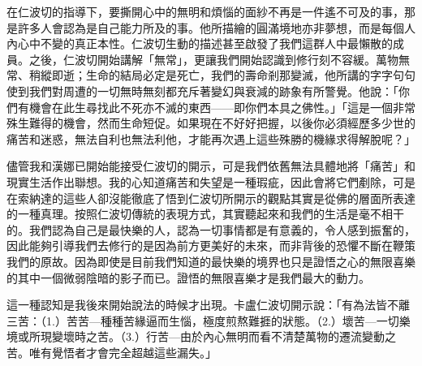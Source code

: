 在仁波切的指導下，要撕開心中的無明和煩惱的面紗不再是一件遙不可及的事，那是許多人會認為是自己能力所及的事。他所描繪的圓滿境地亦非夢想，而是每個人內心中不變的真正本性。仁波切生動的描述甚至啟發了我們這群人中最懶散的成員。之後，仁波切開始講解「無常」，更讓我們開始認識到修行刻不容緩。萬物無常、稍縱即逝；生命的結局必定是死亡，我們的壽命剎那變滅，他所講的字字句句使到我們對周遭的一切無時無刻都充斥著變幻與衰減的跡象有所警覺。他說：「你們有機會在此生尋找此不死亦不滅的東西——即你們本具之佛性。」「這是一個非常殊生難得的機會，然而生命短促。如果現在不好好把握，以後你必須經歷多少世的痛苦和迷惑，無法自利也無法利他，才能再次遇上這些殊勝的機緣求得解脫呢？」

儘管我和漢娜已開始能接受仁波切的開示，可是我們依舊無法具體地將「痛苦」和現實生活作出聯想。我的心知道痛苦和失望是一種瑕疵，因此會將它們剷除，可是在索納達的這些人卻沒能徹底了悟到仁波切所開示的觀點其實是從佛的層面所表達的一種真理。按照仁波切傳統的表現方式，其實聽起來和我們的生活是毫不相干的。我們認為自己是最快樂的人，認為一切事情都是有意義的，令人感到振奮的，因此能夠引導我們去修行的是因為前方更美好的未來，而非背後的恐懼不斷在鞭策我們的原故。因為即使是目前我們知道的最快樂的境界也只是證悟之心的無限喜樂的其中一個微弱陰暗的影子而已。證悟的無限喜樂才是我們最大的動力。

這一種認知是我後來開始說法的時候才出現。卡盧仁波切開示說：「有為法皆不離三苦：（1.）苦苦---種種苦緣逼而生惱，極度煎熬難捱的狀態。（2.）壞苦---一切樂境或所現變壞時之苦。（3.）行苦---由於內心無明而看不清楚萬物的遷流變動之苦。唯有覺悟者才會完全超越這些漏失。」
